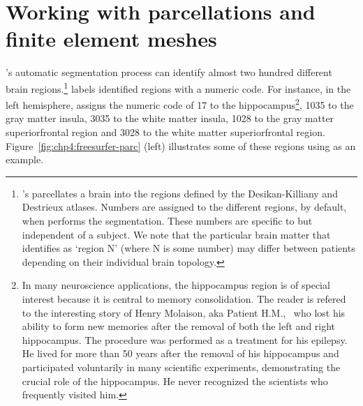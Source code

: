 \section{Working with parcellations and finite element meshes} 
\label{sec:import-freesurfer-parcellation}
{\freesurfer}'s  automatic segmentation process can
identify almost two hundred different brain
regions.\footnote{{\freesurfer}'s  parcellates a brain
  into the regions defined by the Desikan-Killiany and Destrieux
  atlases. Numbers are assigned to the different regions, by default,
  when \freesurfer{} performs the segmentation. These numbers are
  specific to \freesurfer{} but independent of a subject. We note that
  the particular brain matter that \freesurfer{} identifies as `region
  N' (where N is some number) may differ between patients depending on
  their individual brain topology.} {\freesurfer} labels identified
regions with a numeric code. For instance, in the left hemisphere,
\freesurfer{} assigns the numeric code of 17 to the
hippocampus\footnote{In many neuroscience applications, the
  hippocampus region is of special interest because it is central to
  memory consolidation. The reader is refered to the interesting story
  of Henry Molaison, aka Patient H.M.,~\cite{squire2009legacy,
    scoville1957loss} who lost his ability to form new memories after
  the removal of both the left and right hippocampus. The procedure
  was performed as a treatment for his epilepsy. He lived for more
  than 50 years after the removal of his hippocampus and participated
  voluntarily in many scientific experiments, demonstrating the
  crucial role of the hippocampus. He never recognized the scientists
  who frequently visited him.}, 1035 to the gray matter insula, 3035
to the white matter insula, 1028 to the gray matter superiorfrontal
region and 3028 to the white matter superiorfrontal
region. Figure~\ref{fig:chp4:freesurfer-parc} (left) illustrates some
of these regions using  as an
example.
